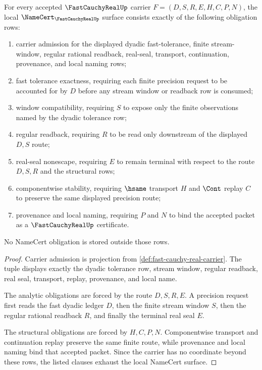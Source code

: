 \begin{theorem}
\label{thm:fast-cauchy-real-namecert-obligations}
For every accepted $\FastCauchyRealUp$ carrier $F=(D,S,R,E,H,C,P,N)$, the local $\NameCert_{\FastCauchyRealUp}$ surface consists exactly of the following obligation rows:
\begin{enumerate}
\item carrier admission for the displayed dyadic fast-tolerance, finite stream-window, regular rational readback, real-seal, transport, continuation, provenance, and local naming rows;
\item fast tolerance exactness, requiring each finite precision request to be accounted for by $D$ before any stream window or readback row is consumed;
\item window compatibility, requiring $S$ to expose only the finite observations named by the dyadic tolerance row;
\item regular readback, requiring $R$ to be read only downstream of the displayed $D,S$ route;
\item real-seal nonescape, requiring $E$ to remain terminal with respect to the route $D,S,R$ and the structural rows;
\item componentwise stability, requiring $\hsame$ transport $H$ and $\Cont$ replay $C$ to preserve the same displayed precision route;
\item provenance and local naming, requiring $P$ and $N$ to bind the accepted packet as a $\FastCauchyRealUp$ certificate.
\end{enumerate}
No NameCert obligation is stored outside those rows.
\end{theorem}
\begin{proof}
Carrier admission is projection from \autoref{def:fast-cauchy-real-carrier}. The tuple displays exactly the dyadic tolerance row, stream window, regular readback, real seal, transport, replay, provenance, and local name.

The analytic obligations are forced by the route $D,S,R,E$. A precision request first reads the fast dyadic ledger $D$, then the finite stream window $S$, then the regular rational readback $R$, and finally the terminal real seal $E$.

The structural obligations are forced by $H,C,P,N$. Componentwise transport and continuation replay preserve the same finite route, while provenance and local naming bind that accepted packet. Since the carrier has no coordinate beyond these rows, the listed clauses exhaust the local NameCert surface.
\end{proof}

